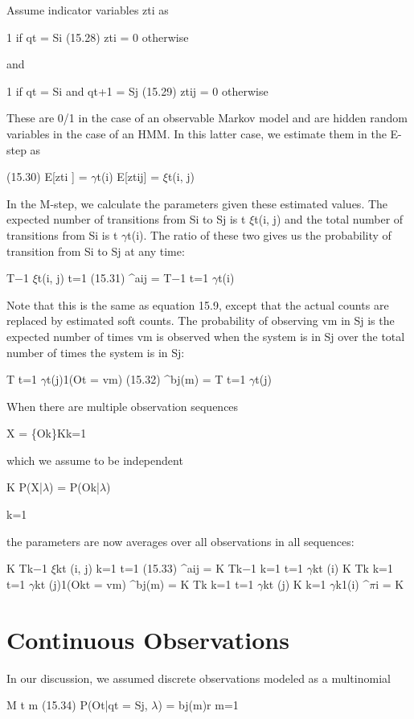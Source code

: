 Assume indicator variables zti as

1 if qt = Si (15.28) zti = 0 otherwise

and

1 if qt = Si and qt+1 = Sj (15.29) ztij = 0 otherwise

These are 0/1 in the case of an observable Markov model and are hidden random variables in the case of an HMM. In this latter case, we estimate them in the E-step as

(15.30) E[zti ] = $\gamma$t(i) E[ztij] = $\xi$t(i, j)

In the M-step, we calculate the parameters given these estimated values. The expected number of transitions from Si to Sj is t $\xi$t(i, j) and the total number of transitions from Si is t $\gamma$t(i). The ratio of these two gives us the probability of transition from Si to Sj at any time:

T$-$1 $\xi$t(i, j) t=1 (15.31) \textasciicircum{}aij = T$-$1 t=1 $\gamma$t(i)

Note that this is the same as equation 15.9, except that the actual counts are replaced by estimated soft counts. The probability of observing vm in Sj is the expected number of times vm is observed when the system is in Sj over the total number of times the system is in Sj:

T t=1 $\gamma$t(j)1(Ot = vm) (15.32) \textasciicircum{}bj(m) = T t=1 $\gamma$t(j)

When there are multiple observation sequences

X = \{Ok\}Kk=1

which we assume to be independent

K P(X|$\lambda$) = P(Ok|$\lambda$)

k=1

the parameters are now averages over all observations in all sequences:

K Tk$-$1 $\xi$kt (i, j) k=1 t=1 (15.33) \textasciicircum{}aij = K Tk$-$1 k=1 t=1 $\gamma$kt (i) K Tk k=1 t=1 $\gamma$kt (j)1(Okt = vm) \textasciicircum{}bj(m) = K Tk k=1 t=1 $\gamma$kt (j) K k=1 $\gamma$k1(i) \textasciicircum{}$\pi$i = K

\section{Continuous Observations}

In our discussion, we assumed discrete observations modeled as a multinomial

M t m (15.34) P(Ot|qt = Sj, $\lambda$) = bj(m)r m=1

